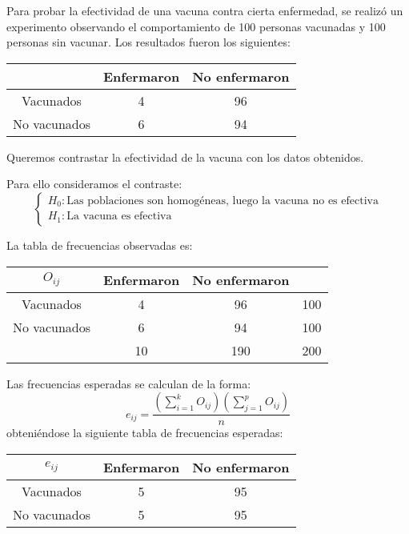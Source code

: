 \begin{exercise}
    Para probar la efectividad de una vacuna contra cierta enfermedad, se realizó un experimento observando el comportamiento de 100 personas vacunadas y 100 personas sin vacunar.
    Los resultados fueron los siguientes:
    \begin{center}
        \begin{tabular}{| c | c c |}
            \hline
                         & Enfermaron & No enfermaron \\
            \hline
            Vacunados    & 4          & 96            \\
            No vacunados & 6          & 94            \\
            \hline
        \end{tabular}
    \end{center}
    Queremos contrastar la efectividad de la vacuna con los datos obtenidos.

    Para ello consideramos el contraste:
    $$\begin{cases}
            H_0: \text{Las poblaciones son homogéneas, luego la vacuna no es efectiva} \\
            H_1: \text{La vacuna es efectiva}
        \end{cases}$$

    La tabla de frecuencias observadas es:
    \begin{center}
        \begin{tabular}{| c | c c | c |}
            \hline
            $O_{ij}$     & Enfermaron & No enfermaron &     \\
            \hline
            Vacunados    & 4          & 96            & 100 \\
            No vacunados & 6          & 94            & 100 \\
            \hline
                         & 10         & 190           & 200 \\
            \hline
        \end{tabular}
    \end{center}

    Las frecuencias esperadas se calculan de la forma:
    $$e_{ij} = \frac{(\sum_{i=1}^k O_{ij})(\sum_{j=1}^p O_{ij})}{n}$$
    obteniéndose la siguiente tabla de frecuencias esperadas:
    \begin{center}
        \begin{tabular}{| c | c c |}
            \hline
            $e_{ij}$     & Enfermaron & No enfermaron \\
            \hline
            Vacunados    & 5          & 95            \\
            No vacunados & 5          & 95            \\
            \hline
        \end{tabular}
    \end{center}


\end{exercise}
